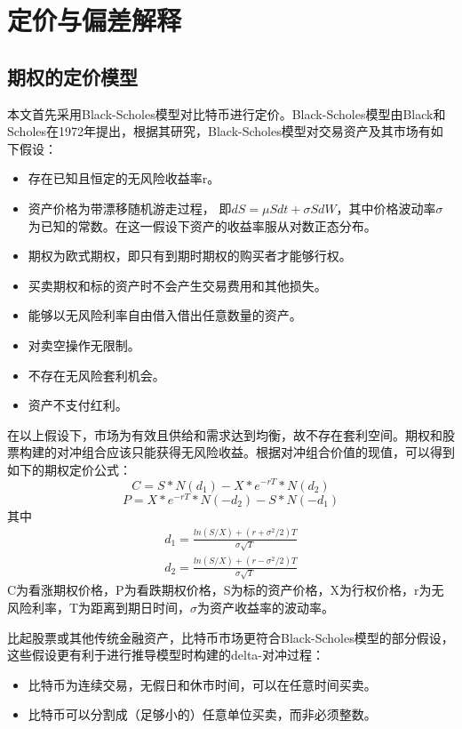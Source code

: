 \chapter{定价与偏差解释}\label{research_method}
\section{期权的定价模型}\label{pricing_model}
本文首先采用Black-Scholes模型对比特币进行定价。Black-Scholes模型由Black和Scholes在1972年提出\cite{J-1972}，根据其研究，Black-Scholes模型对交易资产及其市场有如下假设：
\begin{itemize}
\item 存在已知且恒定的无风险收益率r。
\item 资产价格为带漂移随机游走过程， 即$dS={\mu}Sdt+{\sigma}SdW$，其中价格波动率$\sigma$为已知的常数。在这一假设下资产的收益率服从对数正态分布。
\item 期权为欧式期权，即只有到期时期权的购买者才能够行权。
\item 买卖期权和标的资产时不会产生交易费用和其他损失。
\item 能够以无风险利率自由借入借出任意数量的资产。
\item 对卖空操作无限制。
\item 不存在无风险套利机会。
\item 资产不支付红利。
\end{itemize} 
在以上假设下，市场为有效且供给和需求达到均衡，故不存在套利空间。期权和股票构建的对冲组合应该只能获得无风险收益。根据对冲组合价值的现值，可以得到如下的期权定价公式：
\begin{equation}\label{bs-call}
C=S*N(d_1)-X*e^{-rT}*N(d_2) 
\end{equation}
\begin{equation}\label{bs-put}
P=X*e^{-rT}*N(-d_2)-S*N(-d_1)
\end{equation}
其中
\begin{equation*}
\begin{split}
d_1=\frac{ln(S/X)+(r+\sigma^2/2)T}{\sigma{\sqrt{T}}} \\
d_2=\frac{ln(S/X)+(r-\sigma^2/2)T}{\sigma{\sqrt{T}}}
\end{split}
\end{equation*}
C为看涨期权价格，P为看跌期权价格，S为标的资产价格，X为行权价格，r为无风险利率，T为距离到期日时间，$\sigma$为资产收益率的波动率。

比起股票或其他传统金融资产，比特币市场更符合Black-Scholes模型的部分假设，这些假设更有利于进行推导模型时构建的delta-对冲过程：
\begin{itemize}
\item 比特币为连续交易，无假日和休市时间，可以在任意时间买卖。
\item 比特币可以分割成（足够小的）任意单位买卖，而非必须整数。
\end{itemize}

